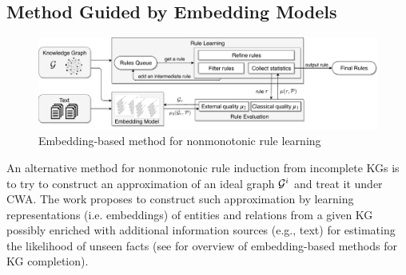 


\subsection{Method Guided by Embedding Models}
  \begin{figure}[t]
\centering
\includegraphics[width=1\textwidth]{figures/rules_overview_H.pdf}
\caption{Embedding-based method for nonmonotonic rule learning}
\label{fig:system}
\end{figure}


An alternative method for nonmonotonic rule induction from incomplete KGs is to try to construct an approximation of an ideal graph $\mathcal{G}^i$ and treat it under CWA. The work \cite{thinh2018} proposes to construct such approximation by learning representations (i.e. embeddings) of entities and relations from a given KG possibly enriched with additional information sources (e.g., text) for estimating the likelihood of unseen facts (see \cite{Wang2017} for overview of embedding-based methods for KG completion).

